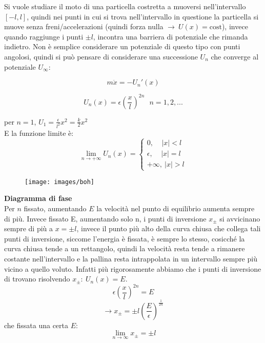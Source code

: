\documentclass[Main.tex]{subfiles}
\begin{document}
\begin{appendic}
    Si vuole studiare il moto di una particella costretta a muoversi nell'intervallo $[-l,l]$, quindi nei punti in cui si trova nell'intervallo in questione la particella si muove senza freni/accelerazioni (quindi forza nulla $\rightarrow \ U(x)=\text{cost}$), invece quando raggiunge i punti $\pm l$, incontra una barriera di potenziale che rimanda indietro. Non è semplice considerare un potenziale di questo tipo con punti angolosi, quindi si può pensare di considerare una successione $U_n$ che converge al potenziale $U_\infty$: 
	
\begin{equation}
  	m \ddot x = - U_n ' (x)
\end{equation}

\begin{equation}
  	U_n (x) = \epsilon \left( \frac{x}{l} \right)^{2n} \ \ \ n = 1, 2, ...
\end{equation}
\begin{osservazione}
	per $n=1$, $U_1 = \frac{\epsilon}{l^2} x^2 = \frac{k}{2}x^2$ \\
	E la funzione limite è:
\begin{equation}
  	\lim_{n \rightarrow + \infty} U_n (x) = \begin{cases}
		0, \ \ \ \ \ |x|<l \\
		\epsilon, \ \ \ \ \ |x| = l \\
		+ \infty , \ |x| >l
	\end{cases}
\end{equation}

\end{osservazione}

\begin{figure}[H]
    \centering
  \texttt{[image: images/boh]}
\end{figure}

\noindent 
	\textbf{Diagramma di fase}\\
    Per $n$ fissato, aumentando $E$ la velocità nel punto di equilibrio aumenta sempre di più.
	Invece fissato E, aumentando solo n, i punti di inversione $x_\pm$ si avvicinano sempre di più a $x=\pm l$, invece il punto più alto della curva chiusa che collega tali punti di inversione, siccome l'energia è fissata, è sempre lo stesso, cosicché la curva chiusa tende a un rettangolo, quindi la velocità resta tende a rimanere costante nell'intervallo e la pallina resta intrappolata in un intervallo sempre più vicino a quello voluto. Infatti più rigorosamente abbiamo che i punti di inversione di trovano risolvendo $x_\pm : \ U_n(x) = E$.
\begin{equation}
  	\epsilon \left(\frac{x}{l}\right)^{2n} = E
\end{equation}
\begin{equation}
  	\rightarrow x_\pm = \pm l \left(\frac{E}{\epsilon}\right)^{\frac{1}{2n}}
\end{equation}
	che fissata una certa $E$:
\begin{equation}
  	\lim _{n \rightarrow \infty} x_{\pm} = \pm l
\end{equation}


\end{appendic}
\end{document}
